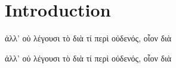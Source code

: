 \documentclass[12pt]{article}
\begin{document}
\section{Introduction}

\begin{otherlanguage}{greek}
ἀλλ' οὐ λέγουσι τὸ διὰ τί περὶ οὐδενός, οἷον διὰ
\end{otherlanguage}

\textgreek{ἀλλ' οὐ λέγουσι τὸ διὰ τί περὶ οὐδενός, οἷον διὰ}
\end{document}
